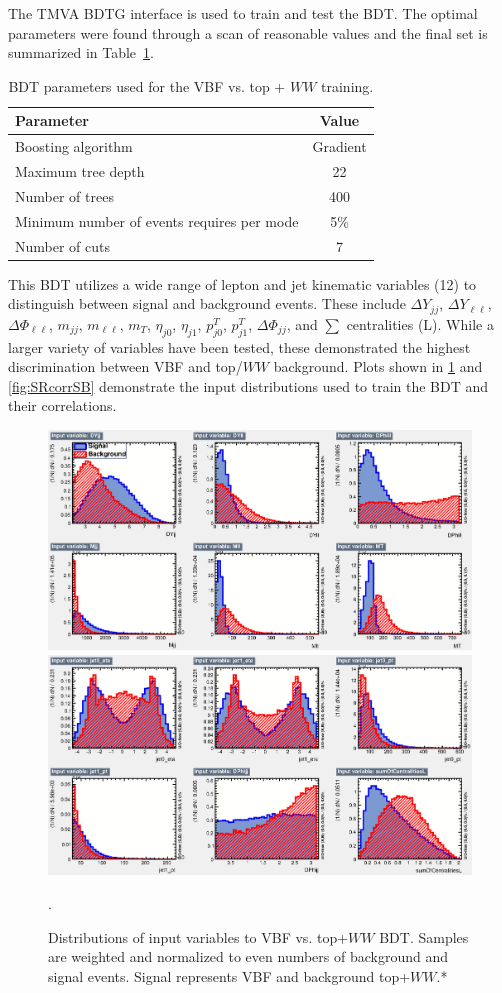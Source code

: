 The TMVA BDTG interface is used to train and test the BDT. The optimal parameters were found through a scan of reasonable values and the final set is summarized in Table~\ref{tab:SRBDTparameters}.
\begin{table}[h!]
\centering
\begin{tabular}{|l|c|}
\hline
Parameter                                    & Value     \\
\hline
Boosting algorithm                           &  Gradient  \\
Maximum tree depth                           &  22       \\
Number of trees                              &  400     \\
Minimum number of events requires per mode   &  5\%      \\
Number of cuts                               &  7        \\
\hline
\end{tabular}
\caption{BDT parameters used for the VBF vs. top + $WW$ training.} 
\label{tab:SRBDTparameters}
\end{table}
This BDT utilizes a wide range of lepton and jet kinematic variables (12) to distinguish between signal and background events. These include $\Delta Y_{jj}$, $\Delta Y_{\ell\ell}$, $\Delta \Phi_{\ell\ell}$, $m_{jj}$, $m_{\ell\ell}$, $m_T$, $\eta_{j0}$, $\eta_{j1}$, $p^T_{j0}$, $p^T_{j1}$, $\Delta \Phi_{jj}$, and $\sum$ centralities (L). While a larger variety of variables have been tested, these demonstrated the highest discrimination between VBF and top/$WW$ background. Plots shown in \ref{fig:SRBDTinput} and \ref{fig:SRcorrSB} demonstrate the input distributions used to train the BDT and their correlations.
\begin{figure}[!htbp]
    \centering
    \includegraphics[width=0.45\linewidth]{Pictures/VBFvsWW+Top/variables_id_c1.eps}
    \includegraphics[width=0.45\linewidth]{Pictures/VBFvsWW+Top/variables_id_c2.eps}
    \caption{Distributions of input variables to VBF vs. top+$WW$ BDT. Samples are weighted and normalized to even numbers of background and signal events. Signal represents VBF and background top+$WW$.*}.
    \label{fig:SRBDTinput}
\end{figure}

